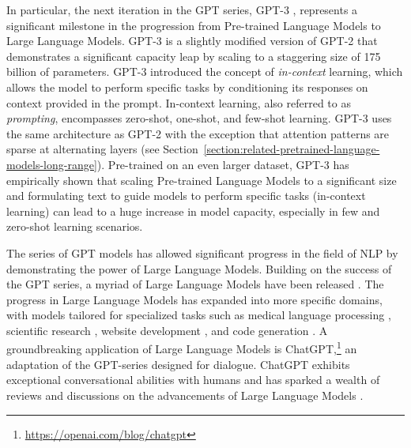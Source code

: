 In particular, the next iteration in the \ac{GPT} series, \ac{GPT}-3 \citep{brown2020language}, represents a significant milestone in the progression from Pre-trained Language Models to Large Language Models. \ac{GPT}-3 is a slightly modified version of \ac{GPT}-2 that demonstrates a significant capacity leap by scaling to a staggering size of 175 billion of parameters. \ac{GPT}-3 introduced the concept of \textit{in-context} learning, which allows the model to perform specific tasks by conditioning its responses on context provided in the prompt. In-context learning, also referred to as \textit{prompting}, encompasses zero-shot, one-shot, and few-shot learning. \ac{GPT}-3 uses the same architecture as \ac{GPT}-2 with the exception that attention patterns are sparse at alternating layers (see Section~\ref{section:related-pretrained-language-models-long-range}). Pre-trained on an even larger dataset, \ac{GPT}-3 has empirically shown that scaling Pre-trained Language Models to a significant size and formulating text to guide models to perform specific tasks (in-context learning) can lead to a huge increase in model capacity, especially in few and zero-shot learning scenarios.



The series of \ac{GPT} models has allowed significant progress in the field of \ac{NLP} by demonstrating the power of Large Language Models. Building on the success of the \ac{GPT} series, a myriad of Large Language Models have been released \citep{scao2022bloom, chowdhery2022palm, touvron2023llama}. The progress in Large Language Models has expanded into more specific domains, with models tailored for specialized tasks such as medical language processing \citep{thirunavukarasu2023large}, scientific research \citep{wang2023scientific}, website development \citep{wang2023software}, and code generation \citep{xu2022systematic}. A groundbreaking application of Large Language Models is ChatGPT,\footnote{\url{https://openai.com/blog/chatgpt}} an adaptation of the \ac{GPT}-series designed for dialogue. ChatGPT exhibits exceptional conversational abilities with humans and has sparked a wealth of reviews and discussions on the advancements of Large Language Models \citep{zhao2023survey, mohamadi2023chatgpt, hadi2023large}. 

